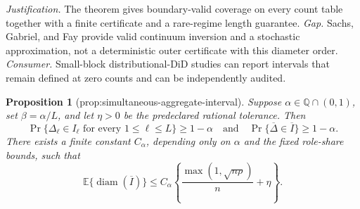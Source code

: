 \documentclass{article}
\newtheorem{proposition}{Proposition}
\begin{document}
\par\smallskip\noindent \textit{Justification.} The theorem gives boundary-valid coverage on every count table together with a finite certificate and a rare-regime length guarantee. \textit{Gap.} Sachs, Gabriel, and Fay provide valid continuum inversion and a stochastic approximation, not a deterministic outer certificate with this diameter order. \textit{Consumer.} Small-block distributional-DiD studies can report intervals that remain defined at zero counts and can be independently audited.

\begin{proposition}[prop:simultaneous-aggregate-interval]\label{prop:simultaneous-aggregate-interval}
Suppose \(\alpha\in\mathbb Q\cap(0,1)\), set \(\beta=\alpha/L\), and let \(\eta>0\) be the predeclared rational tolerance.  Then
\[
\Pr\{\Delta_\ell\in I_\ell\text{ for every }1\le\ell\le L\}\ge1-\alpha
\quad\text{and}\quad
\Pr\{\overline\Delta\in\overline I\}\ge1-\alpha.
\]
There exists a finite constant \(C_\alpha\), depending only on \(\alpha\) and the fixed role-share bounds, such that
\[
\mathbb E\{\operatorname{diam}(\overline I)\}
\le C_\alpha\left\{\frac{\max(1,\sqrt{n\rho})}{n}+\eta\right\}.
\]
\end{proposition}
\end{document}
